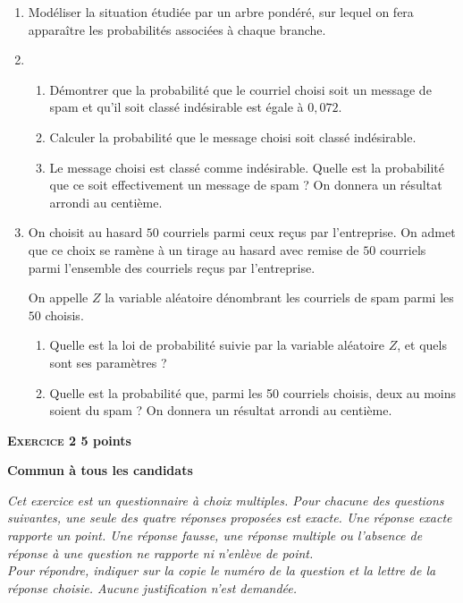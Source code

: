\documentclass[11pt]{article}
\begin{document}
\medskip

\begin{enumerate}
\item Modéliser la situation étudiée par un arbre pondéré, sur lequel on fera apparaître les probabilités associées à chaque branche.
\item 
	\begin{enumerate}
		\item Démontrer que la probabilité que le courriel choisi soit un message de spam et qu'il soit classé indésirable est égale à $0,072$.
		\item Calculer la probabilité que le message choisi soit classé indésirable.
		\item Le message choisi est classé comme indésirable. Quelle est la probabilité que ce soit effectivement un message de spam ? On donnera un résultat arrondi au centième.
	\end{enumerate}
\item On choisit au hasard $50$ courriels parmi ceux reçus par l'entreprise. On admet que ce choix se ramène à un tirage au hasard avec remise de $50$ courriels parmi l'ensemble des courriels reçus par l'entreprise.

On appelle $Z$ la variable aléatoire dénombrant les courriels de spam parmi les $50$ choisis.
	\begin{enumerate}
		\item Quelle est la loi de probabilité suivie par la variable aléatoire $Z$, et quels sont ses paramètres ?
		\item Quelle est la probabilité que, parmi les 50 courriels choisis, deux au moins soient du spam ? On donnera un résultat arrondi au centième.
	\end{enumerate}
\end{enumerate}

\bigskip

\textbf{\textsc{Exercice 2} \hfill 5 points}

\textbf{Commun à tous les candidats}

\medskip

\emph{Cet exercice est un questionnaire à choix multiples. Pour chacune des questions suivantes, une seule des quatre réponses proposées est exacte. Une réponse exacte rapporte un point. Une réponse fausse, une réponse multiple ou l'absence de réponse à une question ne rapporte ni n'enlève de point.\\[5pt]
 Pour répondre, indiquer sur la copie le numéro de la question et la lettre de la réponse choisie. Aucune justification n'est demandée.}
\end{document}
